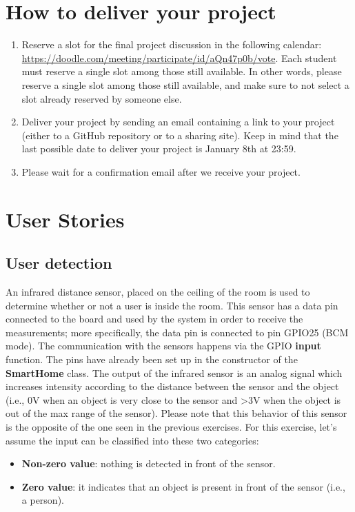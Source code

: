 \section{How to deliver your project}
\begin{enumerate}
    \item Reserve a slot for the final project discussion in the following calendar: \url{https://doodle.com/meeting/participate/id/aQn47p0b/vote}.
    Each student must reserve a single slot among those still available. In other words, please reserve a single slot among those still available, and make sure to not select a slot already reserved by someone else.
    \item Deliver your project by sending an email containing a link to your project (either to a GitHub repository or to a sharing site).
    Keep in mind that the last possible date to deliver your project is January 8th at 23:59. 
    \item Please wait for a confirmation email after we receive your project.
\end{enumerate}

\section{User Stories}
\subsection{User detection}
An infrared distance sensor, placed on the ceiling of the room is used to determine whether or not a user is inside the room. 
This sensor has a data pin connected to the board and used by the system in order to receive the measurements; more specifically, the data pin is connected to pin GPIO25 (BCM mode).
The communication with the sensors happens via the GPIO \textbf{input} function. The pins have already been set up in the constructor of the \textbf{SmartHome} class. 
The output of the infrared sensor is an analog signal which increases intensity according to the distance between the sensor and the object (i.e., 0V when an object is very close to the sensor and >3V when the object is out of the max range of the sensor). 
Please note that this behavior of this sensor is the opposite of the one seen in the previous exercises.
For this exercise, let's assume the input can be classified into these two categories:
\begin{itemize}
    \item \textbf{Non-zero value}: nothing is detected in front of the sensor.
    \item \textbf{Zero value}: it indicates that an object is present in front of the sensor (i.e., a person).
\end{itemize}
